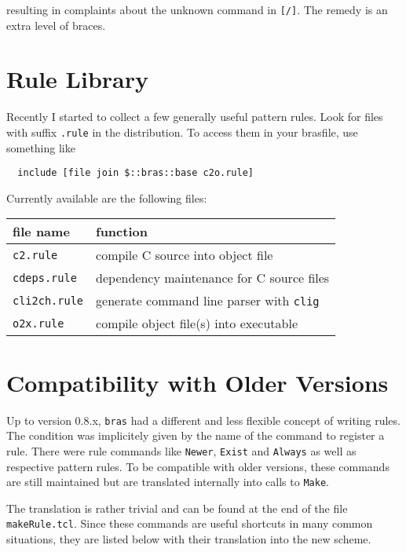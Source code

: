 \documentclass[11pt]{scrartcl}
\newcommand{\bras}{\texttt{bras}}
\begin{document}
resulting in complaints about the unknown command in
\texttt{[/]}. The remedy is an extra level of braces.


\section{Rule Library}

Recently I started to collect a few generally useful pattern rules.
Look for files with suffix \texttt{.rule} in the distribution. To
access them in your brasfile, use something like
\begin{verbatim}
  include [file join $::bras::base c2o.rule]
\end{verbatim}
Currently available are the following files:
\begin{center}
\begin{tabular}{l|l}
file name & function\\\hline
\texttt{c2.rule} & compile C source into object file\\
\texttt{cdeps.rule} & dependency maintenance for C source files\\
\texttt{cli2ch.rule} & generate command line parser with
  \texttt{clig}\cite{Kir00}\\
\texttt{o2x.rule} & compile object file(s) into executable\\
\end{tabular}
\end{center}
\section{Compatibility with Older Versions}

Up to version 0.8.x, \bras{} had a different and less flexible concept
of writing rules. The condition was implicitely given by the name of the
command to register a rule. There were rule commands like
\texttt{Newer}, \texttt{Exist} and \texttt{Always} as well as
respective pattern rules. To be compatible with older versions, these
commands are still maintained but are translated internally into calls 
to \texttt{Make}.

The translation is rather trivial and can be found at the end of the
file \texttt{makeRule.tcl}. Since these commands are useful shortcuts
in many common situations, they are listed below with their
translation into the new scheme.
\end{document}
